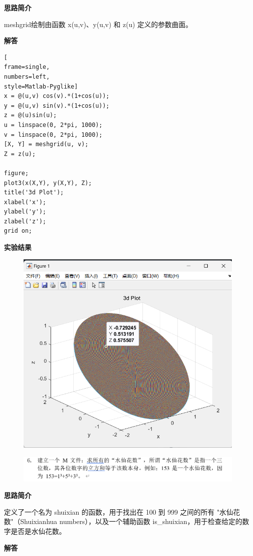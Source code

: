 \documentclass[12pt,UTF8]{ctexart}
\begin{document}
\par \textbf{思路简介}
\par meshgrid绘制由函数 x(u,v)、y(u,v) 和 z(u) 定义的参数曲面。
\par \textbf{解答}

\begin{lstlisting}[
frame=single,
numbers=left,
style=Matlab-Pyglike]
x = @(u,v) cos(v).*(1+cos(u));
y = @(u,v) sin(v).*(1+cos(u));
z = @(u)sin(u);
u = linspace(0, 2*pi, 1000);
v = linspace(0, 2*pi, 1000);
[X, Y] = meshgrid(u, v); 
Z = z(u);

figure;
plot3(x(X,Y), y(X,Y), Z);
title('3d Plot');
xlabel('x');
ylabel('y');
zlabel('z');
grid on;

\end{lstlisting}
\par \textbf{实验结果}
\begin{figure}
    \centering
    \includegraphics[width=0.75\linewidth]{5.1.png}
    
    
\end{figure}

\clearpage




\begin{figure}
    \centering
    \includegraphics[width=1\linewidth]{++6.png}
    
    
\end{figure}
\par \textbf{思路简介}
\par 定义了一个名为 shuixian 的函数，用于找出在 100 到 999 之间的所有 "水仙花数"（Shuixianhua numbers），以及一个辅助函数 is\_shuixian，用于检查给定的数字是否是水仙花数。
\par \textbf{解答}
\end{document}

